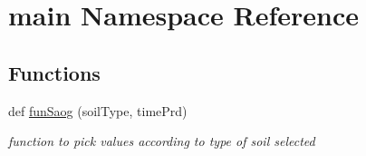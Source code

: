 \hypertarget{namespacemain}{}\section{main Namespace Reference}
\label{namespacemain}
\subsection*{Functions}
\begin{DoxyCompactItemize}
\item 
def \hyperlink{namespacemain_a4f60afd2426ee9409955e4352b3f0486}{fun\+Saog} (soil\+Type, time\+Prd)
\begin{DoxyCompactList}\small\item\em function to pick values according to type of soil selected \end{DoxyCompactList}\end{DoxyCompactItemize}
